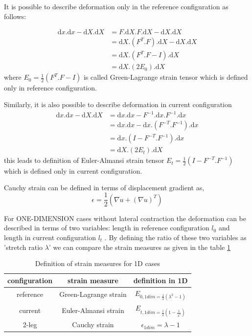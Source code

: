 It is possible to describe deformation only in the reference configuration as follows:

\begin{align*}
    \textrm{d}x.\textrm{d}x - \textrm{d}X.\textrm{d}X &= F.\textrm{d}X.F.\textrm{d}X -\textrm{d}X.\textrm{d}X \\
    &= \textrm{d}X.(F^T . F).\textrm{d}X - \textrm{d}X.\textrm{d}X \\
    &= \textrm{d}X.(F^T . F - I).\textrm{d}X \\
    &= \textrm{d}X.(2E_0).\textrm{d}X
\end{align*}
where $E_0 = \frac{1}{2}(F^T . F - I)$ is called Green-Lagrange strain tensor which is defined only in reference configuration.

Similarly, it is also possible to describe deformation in current configuration
\begin{align*}
    \textrm{d}x.\textrm{d}x - \textrm{d}X.\textrm{d}X &= \textrm{d}x.\textrm{d}x - F^{-1}.\textrm{d}x.F^{-1}.\textrm{d}x\\
    &= \textrm{d}x.\textrm{d}x - \textrm{d}x.(F^{-T} . F^{-1}).\textrm{d}x\\
    &= \textrm{d}x.(I - F^{-T} . F^{-1}).\textrm{d}x \\
    &= \textrm{d}X.(2E_t).\textrm{d}X
\end{align*}
this leads to definition of Euler-Almansi strain tensor $E_t = \frac{1}{2}(I - F^{-T} . F^{-1})$ which is defined only in current configuration.

Cauchy strain can be defined in terms of displacement gradient as,
\begin{equation}
    \epsilon = \frac{1}{2} \left( \nabla u + ( \nabla u)^T \right)
\end{equation}

For ONE-DIMENSION cases without lateral contraction the deformation can be described in terms of two variables: length in reference configuration $l_0$ and length in current configuration $l_t$ . By defining the ratio of these two variables as 'stretch ratio $\lambda$' we can compare the strain measures as given in the table \ref{Strain_measures_def}

\begin{table}[H]
    \centering
    \caption{Definition of strain measures for 1D cases}
    \begin{tabular}{c|cc}
        configuration & strain measure & definition in 1D \\
        \hline
        reference & Green-Lagrange strain & $E_{0,1dim = \frac{1}{2}(\lambda^2-1)}$ \\
        current & Euler-Almansi strain &  $E_{t,1dim = \frac{1}{2}(1 - \frac{1}{\lambda^2})}$ \\
        2-leg & Cauchy strain & $\epsilon_{1dim} = \lambda - 1$
    \end{tabular}
    
    \label{Strain_measures_def}
\end{table}

